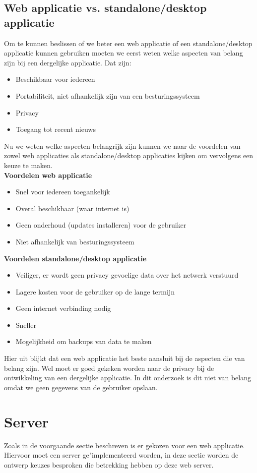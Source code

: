 \documentclass[twoside,openright]{uva-bachelor-thesis}
\begin{document}
		\subsection{Web applicatie vs. standalone/desktop applicatie}
			Om te kunnen beslissen of we beter een web applicatie of een standalone/desktop applicatie kunnen gebruiken moeten we eerst weten welke aspecten van belang zijn bij een dergelijke applicatie. Dat zijn:
			\begin{itemize}
				\item Beschikbaar voor iedereen
				\item Portabiliteit, niet afhankelijk zijn van een besturingssysteem
				\item Privacy
				\item Toegang tot recent nieuws
			\end{itemize}
			Nu we weten welke aspecten belangrijk zijn kunnen we naar de voordelen van zowel web applicaties als standalone/desktop applicaties kijken om vervolgens een keuze te maken.\\[0.5cm]
			\textbf{Voordelen web applicatie}
			\begin{itemize}
				\item Snel voor iedereen toegankelijk
				\item Overal beschikbaar (waar internet is)
				\item Geen onderhoud (updates installeren) voor de gebruiker
				\item Niet afhankelijk van besturingssysteem
			\end{itemize}
			\textbf{Voordelen standalone/desktop applicatie}
			\begin{itemize}
				\item Veiliger, er wordt geen privacy gevoelige data over het netwerk verstuurd
				\item Lagere kosten voor de gebruiker op de lange termijn
				\item Geen internet verbinding nodig
				\item Sneller
				\item Mogelijkheid om backups van data te maken
			\end{itemize}
			Hier uit blijkt dat een web applicatie het beste aansluit bij de aspecten die van belang zijn. Wel moet er goed gekeken worden naar de privacy bij de ontwikkeling van een dergelijke applicatie. In dit onderzoek is dit niet van belang omdat we geen gegevens van de gebruiker opslaan. 
	\section{Server}
		Zoals in de voorgaande sectie beschreven is er gekozen voor een web applicatie. Hiervoor moet een server ge"implementeerd worden, in deze sectie worden de ontwerp keuzes besproken die betrekking hebben op deze web server.
\end{document}
